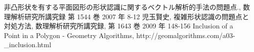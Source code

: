 \begin{thebibliography}{9}

非凸形状を有する平面図形の形状認識に関するベクトル解析的手法の問題点., 数理解析研究所講究録 第 1544 巻 2007 年 8-12
児玉賢史, 複雑形状認識の問題点と対処方法, 数理解析研究所講究録, 第 1643 巻 2009 年 148-156
Inclusion of a Point in a Polygon - Geometry Algorithms,
http://geomalgorithms.com/a03-\_inclusion.html

\end{thebibliography} 